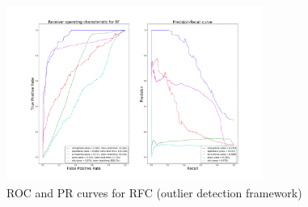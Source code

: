 \begin{figure}[!ht]
    \caption{\acs{ROC} and \acs{PR} curves for \acs{RFC} (outlier detection
    framework)}
    \label{ocrf:fig:rf_roc_pr_unsupervised}
    \centering
    \includegraphics[trim=175 80 175 123, clip,
    width=0.75\textwidth]{./gfx/bench_rf_roc_pr_unsupervised_factorized.png}
\end{figure}

\FloatBarrier
\chapterend
